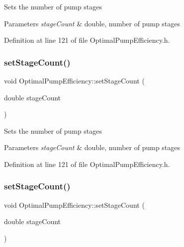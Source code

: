 Sets the number of pump stages 
\begin{DoxyParams}{Parameters}
{\em stage\+Count} & double, number of pump stages \\
\hline
\end{DoxyParams}


Definition at line 121 of file Optimal\+Pump\+Efficiency.\+h.

\mbox{\label{class_optimal_pump_efficiency_a5b0b2a24a87c1c8fc92aa96c6ba4b727}} 
\subsubsection{\texorpdfstring{set\+Stage\+Count()}{setStageCount()}\hspace{0.1cm}{\footnotesize\ttfamily [2/3]}}
{\footnotesize\ttfamily void Optimal\+Pump\+Efficiency\+::set\+Stage\+Count (\begin{DoxyParamCaption}\item[{double}]{stage\+Count }\end{DoxyParamCaption})\hspace{0.3cm}{\ttfamily [inline]}}

Sets the number of pump stages 
\begin{DoxyParams}{Parameters}
{\em stage\+Count} & double, number of pump stages \\
\hline
\end{DoxyParams}


Definition at line 121 of file Optimal\+Pump\+Efficiency.\+h.

\mbox{\label{class_optimal_pump_efficiency_a5b0b2a24a87c1c8fc92aa96c6ba4b727}} 
\subsubsection{\texorpdfstring{set\+Stage\+Count()}{setStageCount()}\hspace{0.1cm}{\footnotesize\ttfamily [3/3]}}
{\footnotesize\ttfamily void Optimal\+Pump\+Efficiency\+::set\+Stage\+Count (\begin{DoxyParamCaption}\item[{double}]{stage\+Count }\end{DoxyParamCaption})\hspace{0.3cm}{\ttfamily [inline]}}

